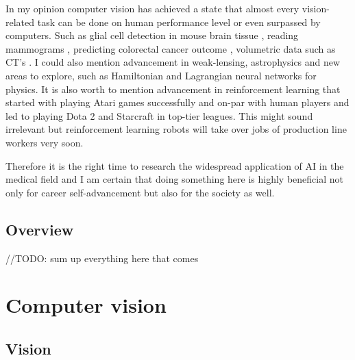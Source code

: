 \documentclass[a4paper,12pt]{article}
\begin{document}
\vspace{4mm}

\par In my opinion computer vision has achieved a state that almost every vision-related task can be done on human performance level or even surpassed by computers. Such as glial cell detection in mouse brain tissue \cite{suleymanova2018deep}, reading mammograms  \cite{ribli2018detecting}, 
predicting colorectal cancer outcome \cite{skrede2020deep}, volumetric data such as CT's \cite{cciccek20163d}. I could also mention advancement in weak-lensing, astrophysics \cite{ribli2019improved} and new areas to explore, such as Hamiltonian \cite{greydanus2019hamiltonian} and Lagrangian \cite{cranmer2020lagrangian} neural networks for physics. It is also worth to mention advancement in reinforcement learning that started with playing Atari games \cite{mnih2013playing} successfully and on-par with human players and led to playing Dota 2 and Starcraft \cite{alphastarblog} in top-tier leagues. This might sound irrelevant but reinforcement learning robots will take over jobs of production line workers \cite{satariano_metz_2020} very soon.

\vspace{4mm}

\par Therefore it is the right time to research the widespread application of AI in the medical field and I am certain that doing something here is highly beneficial not only for career self-advancement but also for the society as well. 

\vspace{7mm}

\subsection{Overview}

\vspace{7mm}

//TODO: sum up everything here that comes

\newpage

\section{Computer vision}

\vspace{7mm}

\subsection{Vision}
\end{document}
